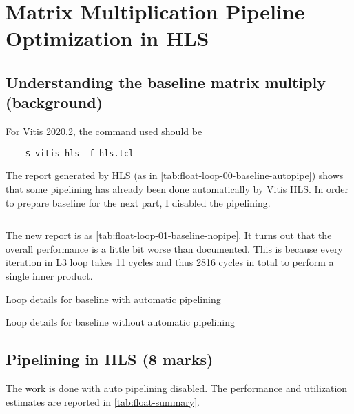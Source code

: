 \section{Matrix Multiplication Pipeline Optimization in HLS}

\subsection{Understanding the baseline matrix multiply (background)}\label{sec:1a}

For Vitis 2020.2, the command used should be
\begin{verbatim}
    $ vitis_hls -f hls.tcl
\end{verbatim}
The report generated by HLS (as in \autoref{tab:float-loop-00-baseline-autopipe}) shows that
some pipelining has already been done automatically by Vitis HLS.
In order to prepare baseline for the next part, I disabled the pipelining.

\inputminted{diff}{program/float_nopipe.diff}

The new report is as \autoref{tab:float-loop-01-baseline-nopipe}.
It turns out that the overall performance is a little bit worse than documented.
This is because every iteration in L3 loop takes 11 cycles and thus
2816 cycles in total to perform a single inner product.

\begin{table}
    \caption{Loop details for baseline with automatic pipelining}
    \label{tab:float-loop-00-baseline-autopipe}
    \centering
    
\end{table}

\begin{table}
    \caption{Loop details for baseline without automatic pipelining}
    \label{tab:float-loop-01-baseline-nopipe}
    \centering
    
\end{table}

\subsection{Pipelining in HLS (8 marks)}

The work is done with auto pipelining disabled.
The performance and utilization estimates are reported in \autoref{tab:float-summary}.

